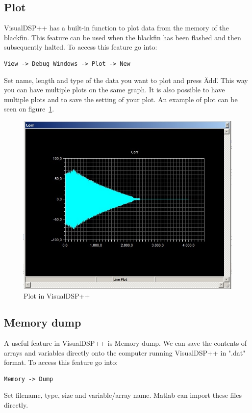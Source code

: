 \subsection{Plot}
VisualDSP++ has a built-in function to plot data from the memory of the blackfin. This feature can be used when the blackfin has been flashed and then subsequently halted. To access this feature go into:
\begin{verbatim}
View -> Debug Windows -> Plot -> New
\end{verbatim}
Set name, length and type of the data you want to plot and press \"Add\". This way you can have multiple plots on the same graph. It is also possible to have multiple plots and to save the setting of your plot. An example of plot can be seen on figure~\ref{fig:visualdspplot}.
\begin{figure}[hbpt]
\centering
\includegraphics[scale=0.5]{billeder/visualdspplot}
\caption{Plot in VisualDSP++}
\label{fig:visualdspplot}
\end{figure}
\subsection{Memory dump}
A useful feature in VisualDSP++ is Memory dump. We can save the contents of arrays and variables directly onto the computer running VisualDSP++ in ".dat" format. To access this feature go into:
\begin{verbatim}
Memory -> Dump
\end{verbatim}
Set filename, type, size and variable/array name. Matlab can import these files directly.